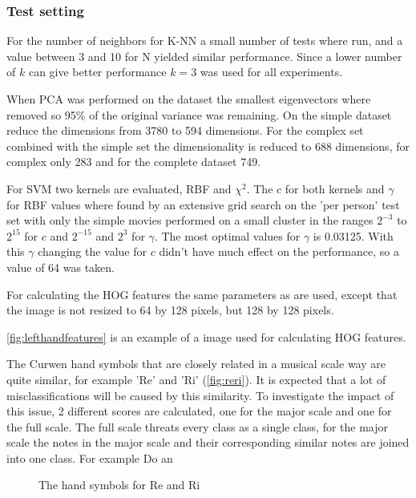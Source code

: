 \subsubsection{Test setting}
For the number of neighbors for K-NN a small number of tests where run, and a value between 3 and 10 for N yielded similar performance. Since a lower number of $k$ can give better performance $k=3$ was used for all experiments.

When PCA was performed on the dataset the smallest eigenvectors where removed so 95\% of the original variance was remaining. On the simple dataset reduce the dimensions from 3780 to 594 dimensions. For the complex set combined with the simple set the dimensionality is reduced to 688 dimensions, for complex only 283 and for the complete dataset 749.

For SVM two kernels are evaluated, RBF and $\chi^2$. The $c$ for both kernels and $\gamma$ for RBF values where found by an extensive grid search on the 'per person' test set with only the simple movies performed on a small cluster in the ranges $2^{-3}$ to $2^{15}$ for $c$ and $2^{-15}$ and $2^3$ for $\gamma$. The most optimal values for $\gamma$ is 0.03125. With this $\gamma$ changing the value for $c$ didn't have much effect on the performance, so a value of 64 was taken.

For calculating the HOG features the same parameters as \cite{watanabe2009} are used, except that the image is not resized to 64 by 128 pixels, but 128 by 128 pixels.

\autoref{fig:lefthandfeatures} is an example of a image used for calculating HOG features.


The Curwen hand symbols that are closely related in a musical scale way are quite similar, for example 'Re' and 'Ri' (\autoref{fig:reri}). It is expected that a lot of misclassifications will be caused by this similarity. To investigate the impact of this issue, 2 different scores are calculated, one for the major scale and one for the full scale. The full scale threats every class as a single class, for the major scale the notes in the major scale and their corresponding similar notes are joined into one class. For example Do an



\begin{figure}[htbp]
  \centering
{}
\hspace{0.03\linewidth}
  \caption{The hand symbols for Re and Ri}
  \label{fig:reri}
\end{figure}


